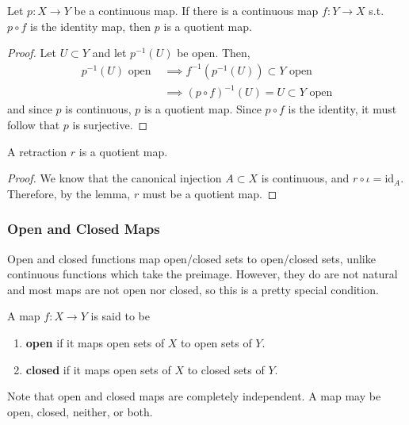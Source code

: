     \begin{lemma} 
      Let $p: X \to Y$ be a continuous map. If there is a continuous map $f: Y \to X$ s.t. $p \circ f$ is the identity map, then $p$ is a quotient map. 
    \end{lemma}
    \begin{proof}
      Let $U \subset Y$ and let $p^{-1} (U)$ be open. Then, 
      \begin{align}
        p^{-1} (U) \text{ open } & \implies f^{-1} (p^{-1} (U)) \subset Y \text{ open} \\ 
                                 & \implies (p \circ f)^{-1}(U) = U \subset Y \text{ open}
      \end{align}
      and since $p$ is continuous, $p$ is a quotient map. Since $p \circ f$ is the identity, it must follow that $p$ is surjective. 
    \end{proof}

    \begin{theorem}
      A retraction $r$ is a quotient map. 
    \end{theorem}
    \begin{proof}
      We know that the canonical injection $A \subset X$ is continuous, and $r \circ \iota = \mathrm{id}_A$. Therefore, by the lemma, $r$ must be a quotient map. 
    \end{proof}

  \subsubsection{Open and Closed Maps}

    Open and closed functions map open/closed sets to open/closed sets, unlike continuous functions which take the preimage. However, they do are not natural and most maps are not open nor closed, so this is a pretty special condition. 

    \begin{definition}
      A map $f: X \rightarrow Y$ is said to be 
      \begin{enumerate}
        \item \textbf{open} if it maps open sets of $X$ to open sets of $Y$. 
        \item \textbf{closed} if it maps open sets of $X$ to closed sets of $Y$. 
      \end{enumerate}
      Note that open and closed maps are completely independent. A map may be open, closed, neither, or both. 
    \end{definition}

